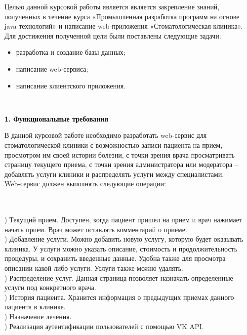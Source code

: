 \documentclass[a4paper]{article}
\begin{document}
\normalsize{Целью данной курсовой работы является является закрепление знаний, полученных в течение курса «Промышленная разработка программ на основе java-технологий» и написание web-приложения «Стоматологическая клиника».}\\


\normalsize{Для достижения полученной цели были поставлены следующие задачи:}
\begin{itemize}
\item разработка и создание базы данных;
\item написание web-сервиса;
\item написание клиентского приложения.
\end{itemize}\\

\newpage

\hfill \break
\hfill \break
\begin{center}
\Large{\textbf{1.  Функциональные требования}}\\
\end{center}


\normalsize{В данной курсовой работе необходимо разработать web-сервис для стоматологической клиники с возможностью записи пациента на прием, просмотром им своей истории болезни, с точки зрения врача просматривать страницу текущего приема, с точки зрения администратора или модератора – добавлять услуги клиники и распределять услуги между специалистами.
}\\
\normalsize{Web-сервис должен выполнять следующие операции:}\\
\begin{enumerate} 
\\
\\
) {Текущий прием. Доступен, когда пациент пришел на прием и врач нажимает начать прием. Врач может оставлять комментарий о приеме. }\\
) {Добавление услуги. Можно добавить новую услугу, которую будет оказывать клиника. У услуги можно указать описание, стоимость и продолжительность процедуры, и сохранить введенные данные. Удобна также для просмотра описании какой-либо услуги. Услуги также можно удалять.}\\
) {Распределение услуг. Данная страница позволяет назначать определенные услуги под конкретного врача. }\\
) {История пациента. Хранится информация о предыдущих приемах данного пациента в клинике. }\\
) {Назначение лечения. }\\
) {Реализация аутентификации пользователей с помощью VK API.}\\
\end{enumerate}
\end{document}
